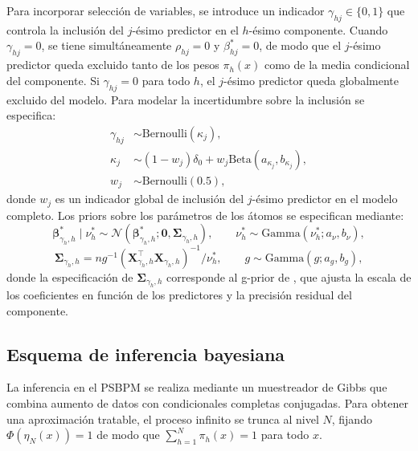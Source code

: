Para incorporar selección de variables, se introduce un indicador $\gamma_{hj} \in \{0,1\}$ que controla la inclusión del $j$-ésimo predictor en el $h$-ésimo componente. Cuando $\gamma_{hj} = 0$, se tiene simultáneamente $\rho_{hj} = 0$ y $\beta_{hj}^* = 0$, de modo que el $j$-ésimo predictor queda excluido tanto de los pesos $\pi_h(x)$ como de la media condicional del componente. Si $\gamma_{hj} = 0$ para todo $h$, el $j$-ésimo predictor queda globalmente excluido del modelo. Para modelar la incertidumbre sobre la inclusión se especifica:
\begin{align}
    \gamma_{hj} &\sim \mathrm{Bernoulli}(\kappa_j), \label{eq:gamma_prior}\\
    \kappa_j &\sim (1 - w_j)\delta_0
    + w_j\mathrm{Beta}(a_{\kappa_j}, b_{\kappa_j}), \label{eq:kappa_prior}\\
    w_j &\sim \mathrm{Bernoulli}(0.5), \label{eq:wj_prior}
\end{align}
donde $w_j$ es un indicador global de inclusión del $j$-ésimo predictor en el modelo completo. Los priors sobre los parámetros de los átomos se especifican mediante:
\begin{equation}\label{eq:prior_theta}
    \boldsymbol{\beta}_{\gamma_h, h}^* \mid \nu_h^*
    \sim \mathcal{N}\!\left(\boldsymbol{\beta}_{\gamma_h,h}^*;
    \mathbf{0}, \boldsymbol{\Sigma}_{\gamma_h,h}\right),
    \qquad
    \nu_h^* \sim \mathrm{Gamma}(\nu_h^*; a_\nu, b_\nu),
\end{equation}
\begin{equation}\label{eq:sigma_gprior}
    \boldsymbol{\Sigma}_{\gamma_h,h} = ng^{-1}
    \left(\mathbf{X}_{\gamma_h,h}^\top
    \mathbf{X}_{\gamma_h,h}\right)^{-1}/\nu_h^*,
    \qquad
    g \sim \mathrm{Gamma}(g; a_g, b_g),
\end{equation}
donde la especificación de $\boldsymbol{\Sigma}_{\gamma_h,h}$ corresponde al g-prior de \citet{02_03_zellner1986gprior}, que ajusta la escala de los coeficientes en función de los predictores y la precisión residual del componente.
 
\subsection{Esquema de inferencia bayesiana}
\label{03_03_02_esquema_inferencia_bayesiana}
La inferencia en el PSBPM se realiza mediante un muestreador de Gibbs que combina aumento de datos con condicionales completas conjugadas. Para obtener una aproximación tratable, el proceso infinito se trunca al nivel $N$, fijando $\Phi(\eta_N(x)) = 1$ de modo que $\sum_{h=1}^{N}\pi_h(x) = 1$ para todo $x$.\\
 
